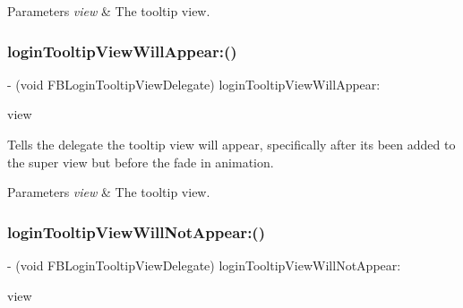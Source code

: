 \begin{DoxyParams}{Parameters}
{\em view} & The tooltip view. \\
\hline
\end{DoxyParams}
\mbox{\label{protocolFBLoginTooltipViewDelegate_01-p_a0d89efb9ebc19a9b47dd4116d5130631}} 
\subsubsection{\texorpdfstring{login\+Tooltip\+View\+Will\+Appear\+:()}{loginTooltipViewWillAppear:()}\hspace{0.1cm}{\footnotesize\ttfamily [5/5]}}
{\footnotesize\ttfamily -\/ (void F\+B\+Login\+Tooltip\+View\+Delegate) login\+Tooltip\+View\+Will\+Appear\+: \begin{DoxyParamCaption}\item[{(\hyperlink{interfaceFBLoginTooltipView}{F\+B\+Login\+Tooltip\+View} $\ast$)}]{view }\end{DoxyParamCaption}\hspace{0.3cm}{\ttfamily [optional]}}

Tells the delegate the tooltip view will appear, specifically after it\textquotesingle{}s been added to the super view but before the fade in animation.


\begin{DoxyParams}{Parameters}
{\em view} & The tooltip view. \\
\hline
\end{DoxyParams}
\mbox{\label{protocolFBLoginTooltipViewDelegate_01-p_a90d8a02f0672da781a5b50e517f75685}} 
\subsubsection{\texorpdfstring{login\+Tooltip\+View\+Will\+Not\+Appear\+:()}{loginTooltipViewWillNotAppear:()}\hspace{0.1cm}{\footnotesize\ttfamily [1/5]}}
{\footnotesize\ttfamily -\/ (void F\+B\+Login\+Tooltip\+View\+Delegate) login\+Tooltip\+View\+Will\+Not\+Appear\+: \begin{DoxyParamCaption}\item[{(\hyperlink{interfaceFBLoginTooltipView}{F\+B\+Login\+Tooltip\+View} $\ast$)}]{view }\end{DoxyParamCaption}\hspace{0.3cm}{\ttfamily [optional]}}

